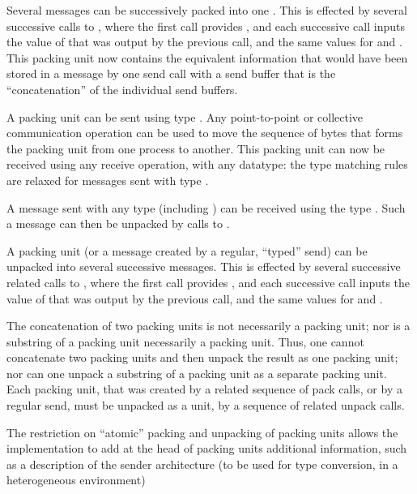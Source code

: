 Several messages can be successively packed into one .
This
is effected by several successive  calls to ,
where the first
call provides , and each successive call inputs the value
of  that was output by the previous call, and the same values
for  and .   This packing unit
now contains
the equivalent information that would have been stored in a message by one send
call with a send buffer that is the ``concatenation'' of the individual send
buffers.

A  packing unit can
be sent using type .  Any point-to-point
or collective communication operation can be used to move the sequence of bytes
that forms the packing unit from one process to another.  This packing unit
can now be
received using any receive operation, with any datatype:  the
type matching rules are relaxed for messages sent with type .

A message sent with any type (including ) can be
received using the type .  Such a message can then be
unpacked by calls to .

A packing unit (or a message created by a regular, ``typed'' send)
can be unpacked into several successive messages.  This is
effected by several successive related calls to , where
the first
call provides , and each successive call inputs the value
of  that was output by the previous call, and the same values
for  and .


The concatenation of two packing units is not necessarily a packing unit; nor is
a substring of a packing unit necessarily a packing unit.  Thus, one cannot
concatenate two packing units and then unpack the result as one packing
unit; nor can one unpack a substring of a packing unit as a separate
packing unit.  Each packing unit, that was created by a related
sequence of pack
calls, or by a regular send,
must be unpacked as a unit, by a sequence of related unpack calls.



\begin{rationale}
The restriction on ``atomic'' packing and unpacking of packing units allows
the implementation to add at the head of packing units additional
information, such as
a description of the sender architecture (to be used for type conversion, in a
heterogeneous environment)
\end{rationale}



